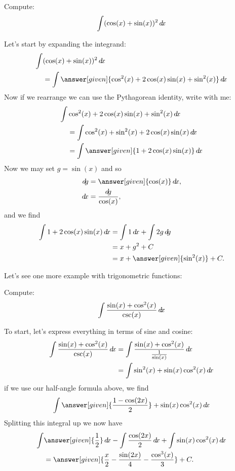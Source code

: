 \documentclass{ximera}
\begin{document}
\begin{example}
  Compute:
  \[
  \int (\cos(x)+\sin(x))^2\mathop{}\!d\! x
  \]
  \begin{explanation}
    Let's start by expanding the integrand:
    \begin{align*}
      \int &(\cos(x)+\sin(x))^2 \d x\\
      &= \int \answer[given]{\cos^2(x) + 2\cos(x)\sin(x) + \sin^2(x)} \d x
    \end{align*}
    Now if we rearrange we can use the Pythagorean identity, write with me:
    \begin{align*}
      \int &\cos^2(x) + 2\cos(x)\sin(x) + \sin^2(x) \d x \\
      &= \int \cos^2(x) + \sin^2(x) + 2\cos(x)\sin(x) \d x\\
      &= \int \answer[given]{1 + 2\cos(x)\sin(x)} \d x
    \end{align*}
    Now we may set $g = \sin(x)$ and so
    \begin{align*}
      \d g &= \answer[given]{\cos(x)} \d x,\\
      \d x & = \frac{\d g}{\cos(x)},
    \end{align*}
    and we find
    \begin{align*}
      \int 1 + 2\cos(x)\sin(x) \d x &= \int 1 \d x + \int 2g \d g\\
      &= x + g^2 + C\\
      &= x + \answer[given]{\sin^2(x)}+C.
    \end{align*}
  \end{explanation}
\end{example}

Let's see one more example with trigonometric functions:

\begin{example}
  Compute:
  \[
  \int \frac{\sin(x) + \cos^2(x)}{\csc(x)} \mathop{}\!d\! x
  \]
  \begin{explanation}
    To start, let's express everything in terms of sine and cosine:
    \begin{align*}
      \int \frac{\sin(x) + \cos^2(x)}{\csc(x)} \mathop{}\!d\! x &= \int \frac{\sin(x) + \cos^2(x)}{\frac{1}{\sin(x)}} \mathop{}\!d\! x\\
      &= \int \sin^2(x) + \sin(x)\cos^2(x) \mathop{}\!d\! x
    \end{align*}
    if we use our half-angle formula above, we find
    \[
    \int \answer[given]{\frac{1-\cos(2x)}{2}}+ \sin(x)\cos^2(x) \d x
    \]
    Splitting this integral up we now have
    \begin{align*}
      \int &\answer[given]{\frac{1}{2}} \d x - \int \frac{\cos(2x)}{2}\d x + \int \sin(x)\cos^2(x) \d x  \\
      &= \answer[given]{\frac{x}{2} - \frac{\sin(2x)}{4} - \frac{\cos^3(x)}{3}}+C.
    \end{align*}
  \end{explanation}
\end{example}
\end{document}
